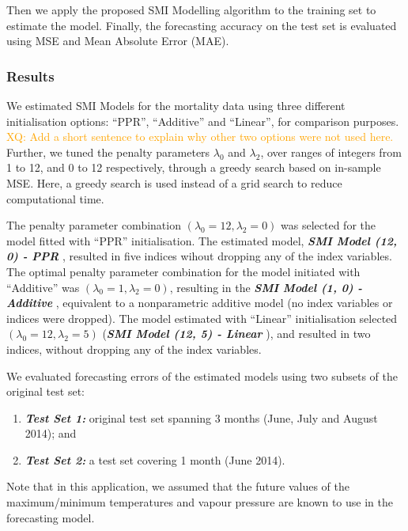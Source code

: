 \documentclass[11pt,a4paper,]{article}
\providecommand{\tightlist}{%
  \setlength{\itemsep}{0pt}\setlength{\parskip}{0pt}}
\begin{document}
Then we apply the proposed SMI Modelling algorithm to the training set
to estimate the model. Finally, the forecasting accuracy on the test set
is evaluated using MSE and Mean Absolute Error (MAE).

\hypertarget{results}{%
\subsubsection{Results}\label{results}}

We estimated SMI Models for the mortality data using three different
initialisation options: ``PPR'', ``Additive'' and ``Linear'', for
comparison purposes.
\textcolor{orange}{XQ: Add a short sentence to explain why other two options were not used here.}
Further, we tuned the penalty parameters \(\lambda_{0}\) and
\(\lambda_{2}\), over ranges of integers from 1 to 12, and 0 to 12
respectively, through a greedy search based on in-sample MSE. Here, a
greedy search is used instead of a grid search to reduce computational
time.

The penalty parameter combination
\((\lambda_{0} = 12, \lambda_{2} = 0)\) was selected for the model
fitted with ``PPR'' initialisation. The estimated model,
\textbf{\emph{SMI Model (12, 0) - PPR }}, resulted in five indices
wihout dropping any of the index variables. The optimal penalty
parameter combination for the model initiated with ``Additive'' was
\((\lambda_{0} = 1, \lambda_{2} = 0)\), resulting in the
\textbf{\emph{SMI Model (1, 0) - Additive }}, equivalent to a
nonparametric additive model (no index variables or indices were
dropped). The model estimated with ``Linear'' initialisation selected
\((\lambda_{0} = 12, \lambda_{2} = 5)\) (\textbf{\emph{SMI Model (12, 5)
- Linear }}), and resulted in two indices, without dropping any of the
index variables.

We evaluated forecasting errors of the estimated models using two
subsets of the original test set:

\begin{enumerate}
\def\labelenumi{\arabic{enumi}.}
\tightlist
\item
  \textbf{\emph{Test Set 1:}} original test set spanning 3 months (June,
  July and August 2014); and
\item
  \textbf{\emph{Test Set 2:}} a test set covering 1 month (June 2014).
\end{enumerate}

Note that in this application, we assumed that the future values of the
maximum/minimum temperatures and vapour pressure are known to use in the
forecasting model.
\end{document}
